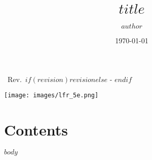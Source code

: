 \documentclass[11pt]{report}
\author{$author$}
\title{$title$}
\date{\today}
\makeatletter
\let\Oldsection\section
\renewcommand{\section}{\FloatBarrier\Oldsection}
\let\thetitle\@title
\def \currentrevision{$if(revision)$$revision$$else$ - $endif$}
\makeatother
\begin{document}
\pagestyle{TitlePages}

\begin{center}
    {\LARGE \thetitle}

    \vspace{0.3cm}

    {\Large ~Rev.~\currentrevision}

    \vspace{1cm}
\end{center}

\vspace{6cm}

\texttt{[image: images/lfr\_5e.png]}

\newpage

\pagestyle{General}

\section{Contents}

\doublespacing
\tableofcontents
\singlespacing

\newpage


$body$


\end{document}
